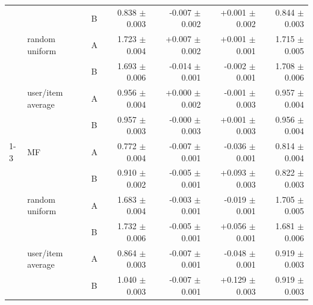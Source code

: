 \begin{table}[H]
{\begin{tabular}{@{}lllrrrr@{}}
         &  & B & 0.838 $\pm$ 0.003 & -0.007 $\pm$ 0.002 & +0.001 $\pm$ 0.002 & 0.844 $\pm$ 0.003 \\
         & random uniform & A & 1.723 $\pm$ 0.004 & +0.007 $\pm$ 0.002 & +0.001 $\pm$ 0.001 & 1.715 $\pm$ 0.005 \\
         &  & B & 1.693 $\pm$ 0.006 & -0.014 $\pm$ 0.001 & -0.002 $\pm$ 0.001 & 1.708 $\pm$ 0.006 \\
         & user/item average & A & 0.956 $\pm$ 0.004 & +0.000 $\pm$ 0.002 & -0.001 $\pm$ 0.003 & 0.957 $\pm$ 0.004 \\
         &  & B & 0.957 $\pm$ 0.003 & -0.000 $\pm$ 0.003 & +0.001 $\pm$ 0.003 & 0.956 $\pm$ 0.004 \\
        \cline{1-3}
        \multirow{6}{*}{Artificial~eccentricity} & MF & A & 0.772 $\pm$ 0.004 & -0.007 $\pm$ 0.001 & -0.036 $\pm$ 0.001 & 0.814 $\pm$ 0.004 \\
         &  & B & 0.910 $\pm$ 0.002 & -0.005 $\pm$ 0.001 & +0.093 $\pm$ 0.003 & 0.822 $\pm$ 0.003 \\
         & random uniform & A & 1.683 $\pm$ 0.004 & -0.003 $\pm$ 0.001 & -0.019 $\pm$ 0.001 & 1.705 $\pm$ 0.005 \\
         &  & B & 1.732 $\pm$ 0.006 & -0.005 $\pm$ 0.001 & +0.056 $\pm$ 0.001 & 1.681 $\pm$ 0.006 \\
         & user/item average & A & 0.864 $\pm$ 0.003 & -0.007 $\pm$ 0.001 & -0.048 $\pm$ 0.001 & 0.919 $\pm$ 0.003 \\
         &  & B & 1.040 $\pm$ 0.003 & -0.007 $\pm$ 0.001 & +0.129 $\pm$ 0.003 & 0.919 $\pm$ 0.003 \\
        \bottomrule
    \end{tabular}%
    }
\end{table}
